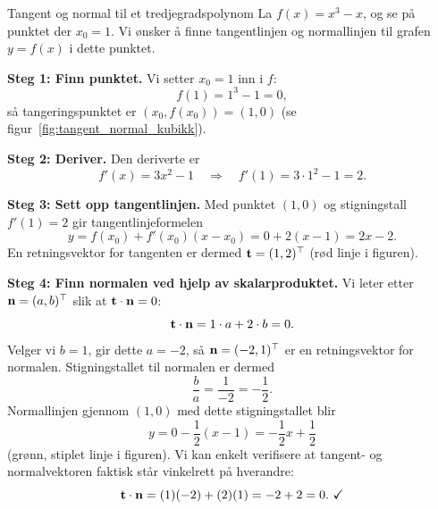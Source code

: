 \begin{eks}{Tangent og normal til et tredjegradspolynom}\label{eks:tangent-normal-kubikk}
La $f(x) = x^3 - x$, og se på punktet der $x_0 = 1$. Vi ønsker å finne tangentlinjen og normallinjen til grafen $y=f(x)$ i dette punktet.

\begin{center}
\label{fig:tangent_normal_kubikk}
\end{center}

\textbf{Steg 1: Finn punktet.} Vi setter $x_0=1$ inn i $f$:
\[
f(1) = 1^3 - 1 = 0,
\]
så tangeringspunktet er $(x_0,f(x_0)) = (1,0)$ (se figur~\ref{fig:tangent_normal_kubikk}).

\textbf{Steg 2: Deriver.} Den deriverte er
\[
f'(x) = 3x^2 - 1 \quad\Longrightarrow\quad f'(1) = 3\cdot 1^2 - 1 = 2.
\]

\textbf{Steg 3: Sett opp tangentlinjen.} Med punktet $(1,0)$ og stigningstall $f'(1)=2$ gir tangentlinjeformelen
\[
y = f(x_0) + f'(x_0)(x-x_0) = 0 + 2(x-1) = 2x-2.
\]
En retningsvektor for tangenten er dermed $\mathbf{t} = (1,2)^\top$ (rød linje i figuren).

\textbf{Steg 4: Finn normalen ved hjelp av skalarproduktet.} Vi leter etter $\mathbf{n}=(a,b)^\top$ slik at $\mathbf{t}\cdot \mathbf{n}=0$:
\[
\mathbf{t}\cdot \mathbf{n} = 1\cdot a + 2\cdot b = 0.
\]
Velger vi $b=1$, gir dette $a=-2$, så $\mathbf{n} = (-2,1)^\top$ er en retningsvektor for normalen. Stigningstallet til normalen er dermed
\[
\frac{b}{a} = \frac{1}{-2} = -\frac12.
\]
Normallinjen gjennom $(1,0)$ med dette stigningstallet blir
\[
y = 0 - \frac12(x-1) = -\frac12 x + \frac12
\]
(grønn, stiplet linje i figuren). Vi kan enkelt verifisere at tangent- og normalvektoren faktisk står vinkelrett på hverandre:
\[
\mathbf{t}\cdot\mathbf{n} = (1)(-2) + (2)(1) = -2+2=0. \ \checkmark
\]
\end{eks}

